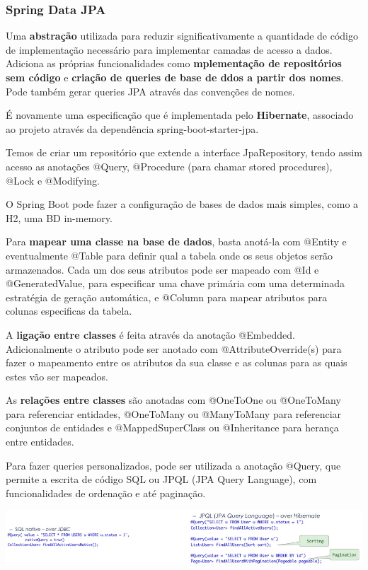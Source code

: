 \documentclass{article}
\begin{document}
\subsubsection*{Spring Data JPA}

Uma \textbf{abstração} utilizada para reduzir significativamente
a quantidade de código de implementação necessário para implementar
camadas de acesso a dados. Adiciona as próprias funcionalidades
como \textbf{mplementação de repositórios sem código} e \textbf{criação de queries de base de ddos a partir dos nomes}.
Pode também gerar queries JPA através das convenções de nomes.

\pagebreak

É novamente uma especificação que é implementada pelo \textbf{Hibernate}, associado ao projeto
através da dependência spring-boot-starter-jpa.

Temos de criar um repositório que extende a interface JpaRepository,
tendo assim acesso as anotações @Query, @Procedure (para chamar stored procedures),
@Lock e @Modifying.

\vspace{2mm}

O Spring Boot pode fazer a configuração de bases de dados mais simples, como a H2, uma BD in-memory.

Para \textbf{mapear uma classe na base de dados}, basta anotá-la com @Entity e eventualmente @Table para definir
qual a tabela onde os seus objetos serão armazenados. Cada um dos seus atributos pode ser mapeado com
@Id e @GeneratedValue, para especificar uma chave primária com uma determinada estratégia de geração
automática, e @Column para mapear atributos para colunas especificas da tabela.

A \textbf{ligação entre classes} é feita através da anotação @Embedded. Adicionalmente o atributo pode ser anotado
com @AttributeOverride(s) para fazer o mapeamento entre os atributos da sua classe e as colunas para as quais estes
vão ser mapeados.

As \textbf{relações entre classes} são anotadas com @OneToOne ou @OneToMany para referenciar entidades, @OneToMany
ou @ManyToMany para referenciar conjuntos de entidades e @MappedSuperClass ou @Inheritance para herança entre
entidades.

Para fazer queries personalizados, pode ser utilizada a anotação @Query, que permite a escrita de código SQL ou
JPQL (JPA Query Language), com funcionalidades de ordenação e até paginação.

\begin{center}
  \includegraphics[scale=0.8]{102}
\end{center}
\end{document}
